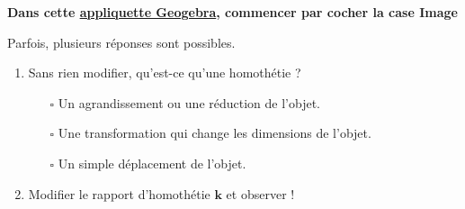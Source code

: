 \begin{activite}
    {\bfseries Dans cette \href{https://www.geogebra.org/classic/wydhjpuc}{appliquette Geogebra}, commencer par cocher la case \og Image \fg}
    \begin{remarque}
        Parfois, plusieurs réponses sont possibles.
    \end{remarque}
    \begin{enumerate}
        \item Sans rien modifier, qu'est-ce qu'une homothétie ?
        \begin{itemize}
            \item[$\square$] Un agrandissement ou une réduction de l'objet.
            \item[$\square$] Une transformation qui change les dimensions de l'objet.
            \item[$\square$] Un simple déplacement de l'objet.            
        \end{itemize}
        \item Modifier le rapport d'homothétie $\mathbf{k}$ et observer !
        \begin{itemize}
\end{itemize}
\end{enumerate}
\end{activite}
